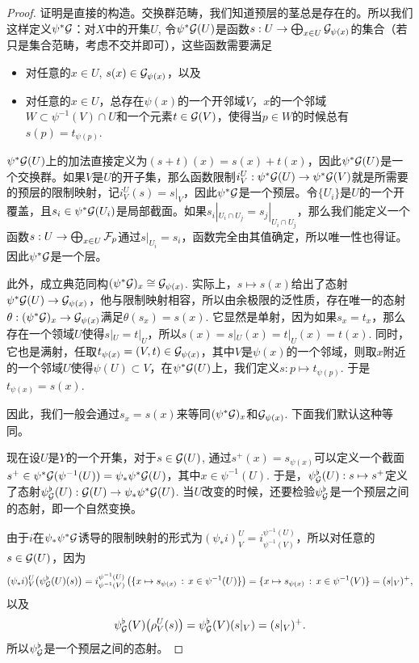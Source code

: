 \begin{proof} 
	证明是直接的构造。交换群范畴，我们知道预层的茎总是存在的。所以我们这样定义$\psi^*\mathcal{G}$：对$X$中的开集$U$, 令$\psi^*\mathcal{G}(U)$是函数$s:U\to \bigoplus_{x\in U}\mathcal{G}_{\psi(x)}$的集合（若只是集合范畴，考虑不交并即可），这些函数需要满足
	\begin{itemize}
		\item 对任意的$x\in U$, $s(x)\in \mathcal{G}_{\psi(x)}$，以及

		\item 对任意的$x\in U$，总存在$\psi(x)$的一个开邻域$V$，$x$的一个邻域$W\subset \psi^{-1}(V)\cap U$和一个元素$t\in \mathcal{G}(V)$，使得当$p\in W$的时候总有$s(p)=t_{\psi(p)}$.
	\end{itemize}

	$\psi^*\mathcal{G}(U)$上的加法直接定义为$(s+t)(x)=s(x)+t(x)$，因此$\psi^*\mathcal{G}(U)$是一个交换群。如果$V$是$U$的开子集，那么函数限制$i^U_V:\psi^*\mathcal{G}(U)\to \psi^*\mathcal{G}(V)$就是所需要的预层的限制映射，记$i^U_V(s)=s|_V$，因此$\psi^*\mathcal{G}$是一个预层。令$\{U_i\}$是$U$的一个开覆盖，且$s_i\in \psi^*\mathcal{G}(U_i)$是局部截面。如果$s_i|_{U_i\cap U_j}=s_j|_{U_i\cap U_j}$，那么我们能定义一个函数$s:U\to \bigoplus_{x\in U}\mathcal{F}_p$通过$s|_{U_i}=s_i$，函数完全由其值确定，所以唯一性也得证。因此$\psi^*\mathcal{G}$是一个层。

	此外，成立典范同构$(\psi^*\mathcal{G})_x\cong \mathcal{G}_{\psi(x)}$. 实际上，$s\mapsto s(x)$给出了态射$\psi^*\mathcal{G}(U)\to \mathcal{G}_{\psi(x)}$，他与限制映射相容，所以由余极限的泛性质，存在唯一的态射$\theta:(\psi^*\mathcal{G})_x\to \mathcal{G}_{\psi(x)}$满足$\theta(s_x)=s(x)$. 它显然是单射，因为如果$s_x=t_x$，那么存在一个领域$U$使得$s|_U=t|_U$，所以$s(x)=s|_U(x)=t|_U(x)=t(x)$. 同时，它也是满射，任取$t_{\psi(x)}=(V,t)\in \mathcal{G}_{\psi(x)}$，其中$V$是$\psi(x)$的一个邻域，则取$x$附近的一个邻域$U$使得$\psi(U)\subset V$，在$\psi^*\mathcal{G}(U)$上，我们定义$s:p\mapsto t_{\psi(p)}$. 于是$t_{\psi(x)}=s(x)$. 

	因此，我们一般会通过$s_x=s(x)$来等同$(\psi^*\mathcal{G})_x$和$\mathcal{G}_{\psi(x)}$. 下面我们默认这种等同。

	现在设$U$是$Y$的一个开集，对于$s\in \mathcal{G}(U)$, 通过$s^+(x)=s_{\psi(x)}$可以定义一个截面$s^+\in \psi^*\mathcal{G}(\psi^{-1}(U))=\psi_*\psi^*\mathcal{G}(U)$，其中$x\in \psi^{-1}(U)$. 于是，$\psi^\flat_{\mathcal{G}}(U):s\mapsto s^+$定义了态射$\psi^\flat_{\mathcal{G}}(U):\mathcal{G}(U)\to \psi_*\psi^*\mathcal{G}(U)$. 当$U$改变的时候，还要检验$\psi^\flat_{\mathcal{G}}$是一个预层之间的态射，即一个自然变换。

	由于$i$在$\psi_*\psi^*\mathcal{G}$诱导的限制映射的形式为$(\psi_* i)^U_V=i^{\psi^{-1}(U)}_{\psi^{-1}(V)}$，所以对任意的$s\in \mathcal{G}(U)$，因为
	\[
		(\psi_* i)^U_V\bigl(\psi^\flat_{\mathcal{G}}(U)(s)\bigr)=i^{\psi^{-1}(U)}_{\psi^{-1}(V)}\left(\{x\mapsto s_{\psi(x)}\,:\, x\in \psi^{-1}(U)\}\right)=\{x\mapsto s_{\psi(x)}\,:\, x\in \psi^{-1}(V)\}=(s|_V)^+,
	\]
	以及
	\[
		\psi^\flat_{\mathcal{G}}(V)\bigl(\rho^U_V(s)\bigr)=\psi^\flat_{\mathcal{G}}(V)(s|_V)=(s|_V)^+.
	\]
	所以$\psi^\flat_{\mathcal{G}}$是一个预层之间的态射。


\end{proof}
